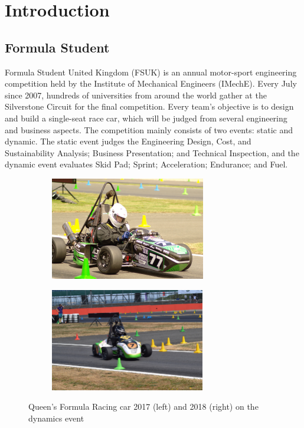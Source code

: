 \newpage
\setcounter{page}{1}
\justifying
\noindent

\section{Introduction}
\subsection{Formula Student}
Formula Student United Kingdom (FSUK) is an annual motor-sport engineering competition held by the Institute of Mechanical Engineers (IMechE). Every July since 2007, hundreds of universities from around the world gather at the Silverstone Circuit for the final competition. Every team's objective is to design and build a single-seat race car, which will be judged from several engineering and business aspects. The competition mainly consists of two events: static and dynamic. The static event judges the Engineering  Design,  Cost, and  Sustainability  Analysis; Business Presentation; and Technical Inspection, and the dynamic event evaluates Skid Pad; Sprint; Acceleration; Endurance; and Fuel.

\begin{figure}[!ht]
\begin{center}
%    
  \begin{subfigure}[b]{0.45\textwidth}
    \includegraphics[height=4.5cm]{Figures/QFR17PHOTO.JPG}
  \end{subfigure}
  \begin{subfigure}[b]{0.45\textwidth}
    \includegraphics[height=4.5cm]{Figures/QFR18PHOTO.jpg}
  \end{subfigure}
%  
  \caption{Queen's Formula Racing car 2017 (left) and 2018 (right) on the dynamics event}
    \label{fig:1}
\end{center}
\end{figure}

